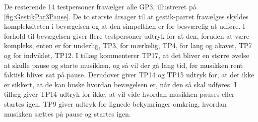 \noindent
% 
De resterende 14 testpersoner fravælger alle GP3, illustreret på \autoref{fig:GestikPar3Pause}. De to største årsager til at gestik-parret fravælges skyldes kompleksiteten i bevægelsen og at den simpelthen er for besværelig at udføre. I forhold til bevægelsen giver flere testpersoner udtryk for at den, foruden at være kompleks, enten er for underlig, TP3, for mærkelig, TP4, for lang og akavet, TP7 og for indviklet, TP12. I tillæg kommenterer TP17, at det bliver en større øvelse at skulle pause og starte musikken, og så vil der gå lang tid, før musikken rent faktisk bliver sat på pause. Derudover giver TP14 og TP15 udtryk for, at det ikke er sikkert, at de kan huske hvordan bevægelsen er, når den så skal udføres. I tillæg giver TP14 udtryk for ikke, at vil vide hvordan musikken pauses eller startes igen. TP9 giver udtryk for lignede bekymringer omkring, hvordan musikken sættes på pause og startes igen.

